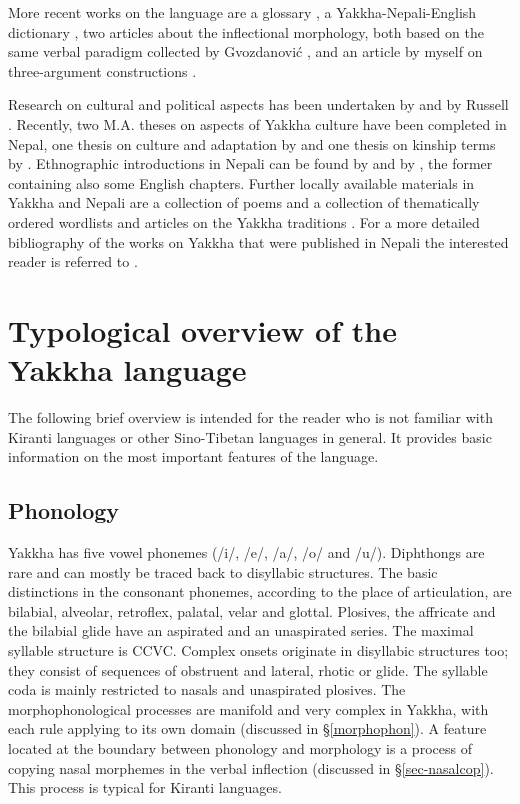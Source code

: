 More recent works on the language are a  glossary \citep{Winter1996Glossary}, a Yakkha-Nepali-English dictionary  \citep{Kongren2007Yakkha}, two articles about the inflectional morphology, both based on the same verbal paradigm collected by Gvozdanović \citep{Gvozdanovic1987How, Driem1994The-Yakkha}, and an article by myself on three-argument constructions \citep{Schackow2012_Referential}.

Research on cultural and political aspects has been undertaken by \citet{Subba1999Politics} and by Russell \citet{Russell1992_Yakha, Russell1997Identity, Russell2000_Missing, Russell2004Traditions, Russell2007Writing, Russell2010_Perceptions}. Recently, two M.A. theses on aspects of Yakkha culture have been completed in Nepal, one thesis on culture and adaptation by \citet{Rai2011_Nature}  and one thesis on kinship terms by  \citet{Linkha2013_kinship}. Ethnographic introductions in Nepali can be found by \citet{Kongren2007Indigenous} and by \citet{Linkha2067Yakkha}, the former containing also some English chapters. Further locally available materials in Yakkha and Nepali are a collection of poems \citep{Dewan2001Opchyongme} and a  collection of thematically ordered wordlists and articles on the Yakkha traditions \citep{Linkha2005Yakkha}. For a more detailed bibliography of the works on Yakkha that were published in Nepali the interested reader is referred to \cite{Rapachaetal2008Indo}. 

 

\section{Typological overview of the Yakkha language}\label{overview-yakkha}

The following brief overview is intended for the reader who is not familiar with Kiranti languages or other Sino-Tibetan languages in general. It provides basic information on the most important features of the language.

\subsection{Phonology}

Yakkha has five vowel phonemes (/i/, /e/, /a/, /o/ and /u/). Diphthongs are rare and can mostly be traced back to disyllabic structures. The basic distinctions in the consonant phonemes, according to  the place of articulation, are bilabial, alveolar, retroflex, palatal, velar and glottal. Plosives, the affricate and the bilabial glide have an aspirated and an unaspirated series. The maximal syllable structure is CCVC. Complex onsets originate in disyllabic structures too; they consist of sequences of obstruent and lateral, rhotic or glide. The syllable coda is mainly restricted to nasals and unaspirated plosives. The morphophonological processes are manifold and very complex in Yakkha, with each rule applying to its own domain (discussed in §\ref{morphophon}). A feature located at the boundary between phonology and morphology is a process of copying nasal morphemes in the verbal inflection (discussed in §\ref{sec-nasalcop}). This process is typical for Kiranti languages.


